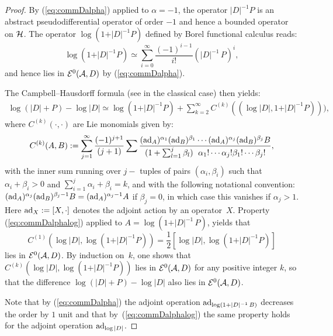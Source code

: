 \begin{proof} By  (\ref{eq:commDalpha}) applied to $\alpha=-1$, the operator
$\vert D\vert^{-1}  P$ is an abstract pseudodif\/ferential operator of order $-1$
and hence a bounded operator on ${\cal H}$.   The operator $\log   (1+\vert
D\vert^{-1}  P)$
    def\/ined by  Borel functional calculus reads:
\[
\log  (1+\vert D\vert^{-1}  P)\simeq \sum_{i=0}^\infty
\frac{(-1)^{i-1}}{i!} (\vert D\vert^{-1}\, P)^i,
\] and hence lies in
   ${\cal E}^0({\cal A}, D)$ by (\ref{eq:commDalpha}).


The Campbell--Hausdorf\/f formula (see \cite{O} in the classical case) then yields:
\begin{gather*} \log   (\vert D\vert+P) -\log  \vert D\vert  \simeq
 \log (1+ \vert D\vert^{-1}  P) +\sum_{k=2}^{\infty } C^{(k)}(
  (\log \vert D\vert, 1+ \vert D\vert^{-1}  P) )
  ),
\end{gather*}where  $C^{(k)}( \cdot , \cdot)$ are  Lie monomials given by:
\[
C^{(k)}(A,B):=\sum\limits_{j=1}^\infty \frac{(-1)^{j+1}}{(j+1)} \sum
\frac{({\rm ad }_A)^{\alpha_1}({\rm ad }_B)^{\beta_1}\cdots
 ({\rm ad }_A)^{\alpha_j}({\rm ad }_B)^{\beta_j}B}{(1+ \sum_{l=1}^j
  \beta_l)\\  \alpha_1!\cdots\alpha_j! \beta_1!\cdots\beta_j!},
 \]
  with the inner sum running over $j-$ tuples of pairs $(\alpha_i,
  \beta_i)$ such that $\alpha_i\!+\!\beta_i\!>\!0$ and $\sum\limits_{i=1}^j
  \alpha_i\!+\! \beta_i\!=\! k$, and with the following notational convention:
   $ ({\rm ad
  }_A)^{\alpha_j}({\rm ad }_B)^{\beta_j-1} B=  ({\rm ad
  }_A)^{\alpha_j-1}  A$ if $\beta_j=0$,  in which case this vanishes if
  $\alpha_j>1$. Here ${\rm ad}_X:=[X, \cdot]$ denotes the adjoint
  action  by an opera\-tor~$X$. Property (\ref{eq:commDalphalog}) applied to $A=
  \log(1+ \vert D\vert^{-1}\,P)$,
   yields that
   \[
    C^{(1)}\left(\log \vert D \vert,
  \log(1+ \vert D\vert^{-1} P)\right)= \frac{1}{2}
\left[ \log \vert D \vert,  \log(1+ \vert D\vert^{-1} P)\right]
\] lies in
${\cal E}^0({\cal A}, D)$. By induction on~$k$, one shows that
$
C^{(k)}\left(\log \vert D \vert,
  \log(1+ \vert D\vert^{-1} P)\right)
$  lies in
${\cal E}^0({\cal A}, D)$ for any positive integer $k$,  so that   the
  dif\/ference $\log (\vert D\vert+P)-\log \vert D\vert $ also lies in ${\cal
  E}^0({\cal A}, D)$.

 Note that by (\ref{eq:commDalpha}) the adjoint operation
    ${\rm ad }_{\log(1+ \vert D\vert^{-1}\,B)} $  decreases the order by $1$
     unit and that   by~(\ref{eq:commDalphalog}) the same property holds
      for  the adjoint operation  ${\rm ad }_{\log \vert D\vert} $.  \end{proof}

